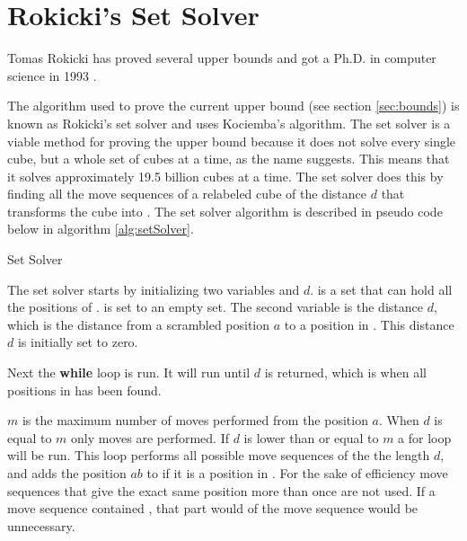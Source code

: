 \chapter{Rokicki's Set Solver}
\label{sec:setSolver}
Tomas Rokicki has proved several upper bounds and got a Ph.D. in computer science in 1993 \cite{rokicki09}. 

The algorithm used to prove the current upper bound (see section \ref{sec:bounds}) is known as Rokicki's set solver and uses Kociemba's algorithm. The set solver is a viable method for proving the upper bound because it does not solve every single cube, but a whole set of cubes at a time, as the name suggests. This means that it solves approximately 19.5 billion cubes at a time.
The set solver does this by finding all the move sequences of a relabeled cube of the distance $d$ that transforms the cube into . 
The set solver algorithm is described in pseudo code below in algorithm \ref{alg:setSolver}.
\begin{algorithm}[!h]                     
\caption{Set Solver \cite{rokicki09}}          
\label{alg:setSolver}        
\begin{algorithmic}[1]
\LOOP
				\ENDIF
			\ENDFOR
		\ENDIF
		\ENDIF
	\ENDIF
\ENDLOOP
\end{algorithmic}
\end{algorithm}

The set solver starts by initializing two variables  and $d$. 
 is a set that can hold all the positions of . 
 is set to an empty set. 
The second variable is the distance $d$, which is the distance from a scrambled position $a$ to a position in . 
This distance $d$ is initially set to zero.

Next the \textbf{while} loop is run. It will run until $d$ is returned, which is when all positions in  has been found.

$m$ is the maximum number of  moves performed from the position $a$. When $d$ is equal to $m$ only  moves are performed.
If $d$ is lower than or equal to $m$ a for loop will be run. This loop performs all possible move sequences of the the length $d$, and adds the position $ab$ to  if it is a position in . 
For the sake of efficiency move sequences that give the exact same position more than once are not used. If a move sequence contained , that part would  of the move sequence would be unnecessary. 


